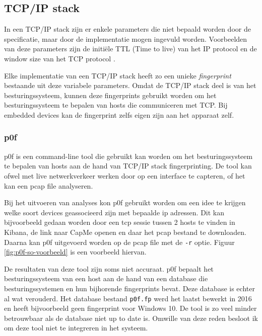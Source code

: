 \documentclass[a4paper, 12pt]{report}
\begin{document}
\subsection{TCP/IP stack}
In een TCP/IP stack zijn er enkele parameters die niet bepaald worden door de specificatie, maar door de implementatie mogen ingevuld worden.
Voorbeelden van deze parameters zijn de initiële TTL (Time to live) van het IP protocol en de window size van het TCP protocol \autocite{wikipedia:fingerprinting}.

Elke implementatie van een TCP/IP stack heeft zo een unieke \emph{fingerprint} bestaande uit deze variabele parameters.
Omdat de TCP/IP stack deel is van het besturingssysteem, kunnen deze fingerprints gebruikt worden om het besturingssysteem te bepalen van hosts die communiceren met TCP.
Bij embedded devices kan de fingerprint zelfs eigen zijn aan het apparaat zelf.

\subsubsection{p0f}
p0f is een command-line tool die gebruikt kan worden om het besturingssysteem te bepalen van hosts aan de hand van TCP/IP stack fingerprinting.
De tool kan ofwel met live netwerkverkeer werken door op een interface te capteren, of het kan een pcap file analyseren.

Bij het uitvoeren van analyses kon p0f gebruikt worden om een idee te krijgen welke soort devices geassocieerd zijn met bepaalde ip adressen.
Dit kan bijvoorbeeld gedaan worden door een tcp sessie tussen 2 hosts te vinden in Kibana, de link naar CapMe openen en daar het pcap bestand te downloaden.
Daarna kan p0f uitgevoerd worden op de pcap file met de \lstinline|-r| optie.
Figuur \ref{fig:p0f-so-voorbeeld} is een voorbeeld hiervan.

De resultaten van deze tool zijn soms niet accuraat.
p0f bepaalt het besturingssysteem van een host aan de hand van een database die besturingssystemen en hun bijhorende fingerprints bevat.
Deze database is echter al wat verouderd.
Het database bestand \lstinline|p0f.fp| werd het laatst bewerkt in 2016 en heeft bijvoorbeeld geen fingerprint voor Windows 10.
De tool is zo veel minder betrouwbaar als de database niet up to date is.
Omwille van deze reden besloot ik om deze tool niet te integreren in het systeem.
\end{document}
